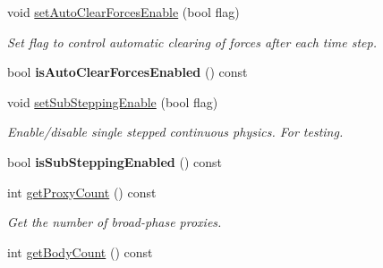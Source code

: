 \begin{DoxyCompactItemize}
\item 
void \hyperlink{class_magnum_1_1_physics3_1_1_world_a45468d5bb39cd67597fb72f156a96627}{set\+Auto\+Clear\+Forces\+Enable} (bool flag)\hypertarget{class_magnum_1_1_physics3_1_1_world_a45468d5bb39cd67597fb72f156a96627}{}\label{class_magnum_1_1_physics3_1_1_world_a45468d5bb39cd67597fb72f156a96627}

\begin{DoxyCompactList}\small\item\em Set flag to control automatic clearing of forces after each time step. \end{DoxyCompactList}\item 
bool {\bfseries is\+Auto\+Clear\+Forces\+Enabled} () const \hypertarget{class_magnum_1_1_physics3_1_1_world_a543d96826067f46ed0e5e73ca22852dd}{}\label{class_magnum_1_1_physics3_1_1_world_a543d96826067f46ed0e5e73ca22852dd}

\item 
void \hyperlink{class_magnum_1_1_physics3_1_1_world_ab36a7906645a127d6cf13138055d5151}{set\+Sub\+Stepping\+Enable} (bool flag)\hypertarget{class_magnum_1_1_physics3_1_1_world_ab36a7906645a127d6cf13138055d5151}{}\label{class_magnum_1_1_physics3_1_1_world_ab36a7906645a127d6cf13138055d5151}

\begin{DoxyCompactList}\small\item\em Enable/disable single stepped continuous physics. For testing. \end{DoxyCompactList}\item 
bool {\bfseries is\+Sub\+Stepping\+Enabled} () const \hypertarget{class_magnum_1_1_physics3_1_1_world_ad3392f5442111b16ddd4eed5e9eebf0b}{}\label{class_magnum_1_1_physics3_1_1_world_ad3392f5442111b16ddd4eed5e9eebf0b}

\item 
int \hyperlink{class_magnum_1_1_physics3_1_1_world_af5990543d265f5e16af391c4ece55887}{get\+Proxy\+Count} () const \hypertarget{class_magnum_1_1_physics3_1_1_world_af5990543d265f5e16af391c4ece55887}{}\label{class_magnum_1_1_physics3_1_1_world_af5990543d265f5e16af391c4ece55887}

\begin{DoxyCompactList}\small\item\em Get the number of broad-\/phase proxies. \end{DoxyCompactList}\item 
int \hyperlink{class_magnum_1_1_physics3_1_1_world_a607ed82ab3bd5b08aa1512f75ecec981}{get\+Body\+Count} () const \hypertarget{class_magnum_1_1_physics3_1_1_world_a607ed82ab3bd5b08aa1512f75ecec981}{}\label{class_magnum_1_1_physics3_1_1_world_a607ed82ab3bd5b08aa1512f75ecec981}


\end{DoxyCompactItemize}
